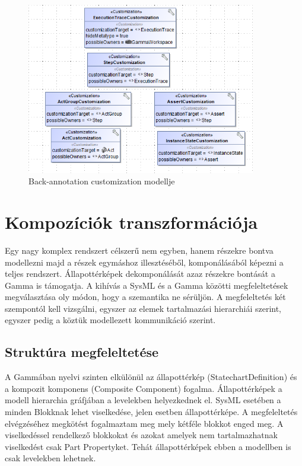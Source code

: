 \begin{figure}[!ht]
	\centering
	\includegraphics[width=100mm, keepaspectratio]{figures/contribution/trace-profile.png}
	\caption{Back-annotation customization modellje}
	\label{fig:contribution-trace-customization}
\end{figure}
 


\section{Kompozíciók transzformációja}

Egy nagy komplex rendszert célszerű nem egyben, hanem részekre bontva modellezni majd a részek egymáshoz illesztéséből, komponálásából képezni a teljes rendszert. Állapottérképek dekomponálását azaz részekre bontását a Gamma is támogatja. A kihívás a SysML és a Gamma közötti megfeleltetések megválasztása oly módon, hogy a szemantika ne sérüljön. A megfeleltetés két szempontól kell vizsgálni, egyszer az elemek tartalmazási hierarchiái szerint, egyszer pedig a köztük modellezett kommunikáció szerint.

\subsection{Struktúra megfeleltetése}
A Gammában nyelvi szinten elkülönül az állapottérkép (StatechartDefinition) és a kompozit komponens (Composite Component) fogalma. Állapottérképek a modell hierarchia gráfjában a levelekben helyezkednek el. SysML esetében a minden Blokknak lehet viselkedése, jelen esetben állapottérképe. A megfeleltetés elvégzéséhez megkötést fogalmaztam meg mely kétféle blokkot enged meg. A viselkedéssel rendelkező blokkokat és azokat amelyek nem tartalmazhatnak viselkedést csak Part Propertyket. Tehát állapottérképek ebben a modellben is csak levelekben lehetnek.

